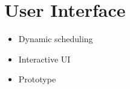 
\chapter{User Interface}

\begin{itemize}
	\item Dynamic scheduling
	\item Interactive UI
	\item Prototype
\end{itemize}
